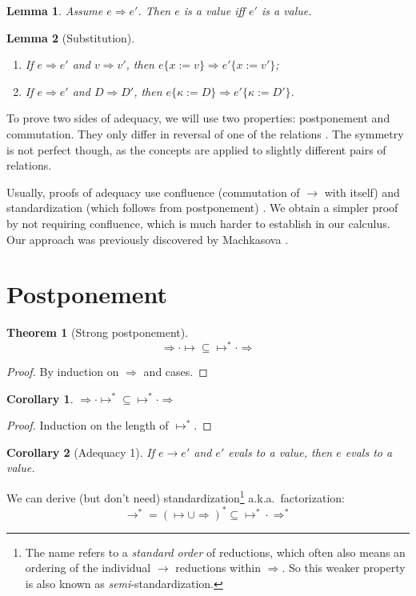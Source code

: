 \documentclass[a4paper, 11pt,titlepage, openright, twoside]{report}
\newcommand{\Int}{\Rightarrow}
\newcommand{\subst}[2]{\{#1{:=}#2\}}
\newcommand{\+}{\enspace}
\newtheorem{corollary}{Corollary}
\newtheorem{lemma}{Lemma}
\newtheorem{theorem}{Theorem}
\begin{document}
\begin{lemma} Assume $e \Int e'$. Then $e$ is a value iff $e'$ is a value.
\end{lemma}

\begin{lemma}[Substitution]
	\item
	\begin{enumerate}
		\item If $e \Int e'$ and $v \Int v'$, then $e\subst{x}{v} \Int e'\subst{x}{v'}$;
		\item If $e \Int e'$ and $D \Int D'$, then $e\subst{κ}{D} \Int e'\subst{κ}{D'}$.
	\end{enumerate}
\end{lemma}

To prove two sides of adequacy, we will use two properties: postponement and commutation.
They only differ in reversal of one of the relations \cite{factorize}.
The symmetry is not perfect though, as the concepts are applied to slightly different pairs of relations.

Usually, proofs of adequacy use confluence (commutation of $→$ with itself) and standardization (which follows from postponement) \cite{Plotkin75, crary2009}.
We obtain a simpler proof by not requiring confluence, which is much harder to establish in our calculus.
Our approach was previously discovered by Machkasova \cite{machka}.

\section{Postponement}

\begin{theorem}[Strong postponement]
	$${\Int · ↦} ⊆ {↦^* · \Int}$$
\end{theorem}
\begin{proof}
	By induction on $\Int$ and cases.
\end{proof}
\begin{corollary}
	${\Int · ↦^*} ⊆ {↦^* · \Int}$
\end{corollary}
\begin{proof}
	Induction on the length of $↦^*$.
\end{proof}
\begin{corollary}[Adequacy 1]
	If $e → e'$ and $e'$ evals to a value, then $e$ evals to a value.
\end{corollary}

We can derive (but don't need) standardization\footnote{
	The name refers to a \textit{standard order} of reductions,
	which often also means an ordering of the individual $→$ reductions within $\Int$.
	So this weaker property is also known as \textit{semi}-standardization.
} a.k.a.\ factorization:
$$→^* = (↦ ∪ \Int)^* ⊆ {↦^* · \Int^*}$$
\end{document}
